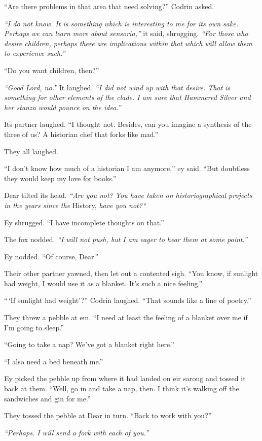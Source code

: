 ``Are there problems in that area that need solving?'' Codrin asked.

\emph{``I do not know. It is something which is interesting to me for its own sake. Perhaps we can learn more about sensoria,''} it said, shrugging. \emph{``For those who desire children, perhaps there are implications within that which will allow them to experience such.''}

``Do you want children, then?''

\emph{``Good Lord, no.''} It laughed. \emph{``I did not wind up with that desire. That is something for other elements of the clade. I am sure that Hammered Silver and her stanza would pounce on the idea.''}

Its partner laughed. ``I thought not. Besides, can you imagine a synthesis of the three of us? A historian chef that forks like mad.''

They all laughed.

``I don't know how much of a historian I am anymore,'' ey said. ``But doubtless they would keep my love for books.''

Dear tilted its head. \emph{``Are you not? You have taken on historiographical projects in the years since the} History, \emph{have you not?{}``}

Ey shrugged. ``I have incomplete thoughts on that.''

The fox nodded. \emph{``I will not push, but I am eager to hear them at some point.''}

Ey nodded. ``Of course, Dear.''

Their other partner yawned, then let out a contented sigh. ``You know, if sunlight had weight, I would use it as a blanket. It's such a nice feeling.''

``\,`If sunlight had weight'?'' Codrin laughed. ``That sounds like a line of poetry.''

They threw a pebble at em. ``I need at least the feeling of a blanket over me if I'm going to sleep.''

``Going to take a nap? We've got a blanket right here.''

``I also need a bed beneath me.''

Ey picked the pebble up from where it had landed on eir sarong and tossed it back at them. ``Well, go in and take a nap, then. I think it's walking off the sandwiches and gin for me.''

They tossed the pebble at Dear in turn. ``Back to work with you?''

\emph{``Perhaps. I will send a fork with each of you.''}

